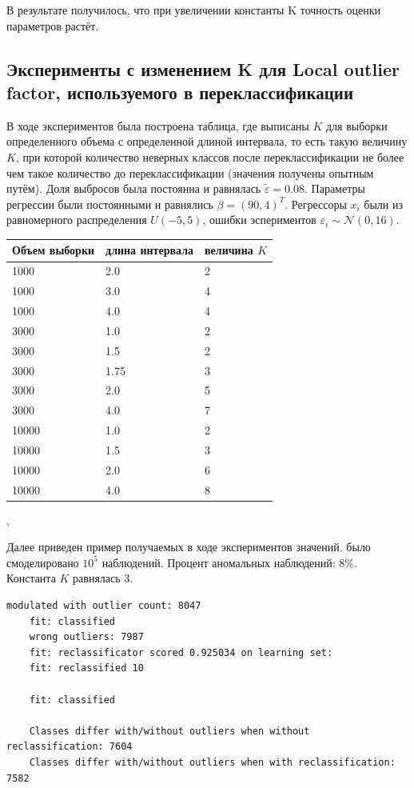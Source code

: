 В результате получилось, что при увеличении константы K точность оценки параметров растёт. 

\subsection{Эксперименты с изменением K для Local outlier factor, используемого в переклассификации}\label{ss3_3_2}
В ходе экспериментов была построена таблица, где выписаны $K$ для выборки определенного объема с определенной длиной интервала, то есть такую величину $K$, при которой количество неверных классов после переклассификации не более чем такое количество до переклассификации (значения получены опытным путём).
Доля выбросов была постоянна и равнялась $\widetilde{\varepsilon}=0.08$. Параметры регрессии были постоянными и равнялись $\beta=(90,4)^T$. 
Регрессоры $x_i$ были из равномерного распределения $U(-5,5)$, ошибки эспериментов $\varepsilon_i\sim \mathcal{N}(0,16)$.

\begin{center}
    \label{tab2}
    \begin{tabular}{|p{5cm}|p{5cm}|p{5cm}|}
        \hline
        Объем выборки&длина интервала& величина $K$\\
        \hline
        1000 & 2.0 & 2\\
        1000 & 3.0 & 4\\
        1000 & 4.0 & 4\\

        3000 & 1.0 & 2\\
        3000 & 1.5 & 2\\
        3000 & 1.75 & 3\\
        3000 & 2.0 & 5\\
        3000 & 4.0 & 7\\

        10000 & 1.0 & 2\\
        10000 & 1.5 & 3\\
        10000 & 2.0 & 6\\
        10000 & 4.0 & 8\\
        \hline
    \end{tabular},
\end{center}
Далее приведен пример получаемых в ходе экспериментов значений.
было смоделировано $10^5$ наблюдений. Процент аномальных наблюдений: $8\%$. Константа $K$ равнялась 3.
\begin{Verbatim}[fontsize=\scriptsize]
    modulated with outlier count: 8047
    fit: classified
    wrong outliers: 7987
    fit: reclassificator scored 0.925034 on learning set:
    fit: reclassified 10
    
    fit: classified
    
    Classes differ with/without outliers when without reclassification: 7604
    Classes differ with/without outliers when with reclassification: 7582
\end{Verbatim}

